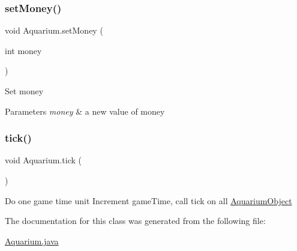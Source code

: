 \subsubsection{\texorpdfstring{set\+Money()}{setMoney()}}
{\footnotesize\ttfamily void Aquarium.\+set\+Money (\begin{DoxyParamCaption}\item[{int}]{money }\end{DoxyParamCaption})\hspace{0.3cm}{\ttfamily [inline]}}

Set money 
\begin{DoxyParams}{Parameters}
{\em money} & a new value of money \\
\hline
\end{DoxyParams}
\mbox{\label{class_aquarium_a62647cfa861f70d29c19fc5e27b4b77b}} 
\subsubsection{\texorpdfstring{tick()}{tick()}}
{\footnotesize\ttfamily void Aquarium.\+tick (\begin{DoxyParamCaption}{ }\end{DoxyParamCaption})\hspace{0.3cm}{\ttfamily [inline]}}

Do one game time unit Increment game\+Time, call tick on all \mbox{\hyperlink{class_aquarium_object}{Aquarium\+Object}} 

The documentation for this class was generated from the following file\+:\begin{DoxyCompactItemize}
\item 
\mbox{\hyperlink{_aquarium_8java}{Aquarium.\+java}}\end{DoxyCompactItemize}
